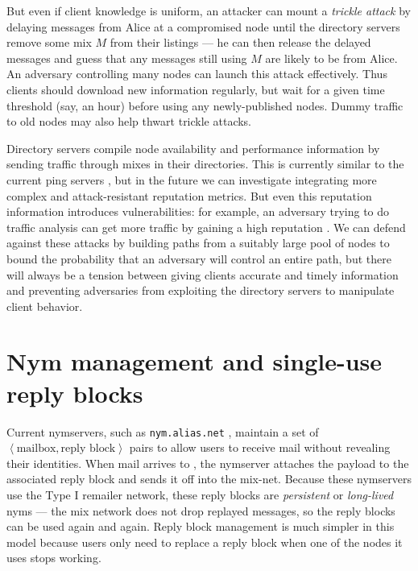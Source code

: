 \documentclass[11pt]{IEEEtran}
\newcommand\emailaddr{\begingroup \def\UrlLeft{<}\def\UrlRight{>}\urlstyle{tt}\Url}
\begin{document}
But even if client knowledge is uniform, an attacker can mount a
\emph{trickle attack} by delaying messages from Alice at a compromised
node until the directory servers remove some mix $M$ from their listings
--- he can then release the delayed messages and guess that any messages
still using $M$ are likely to be from Alice. An adversary controlling
many nodes can launch this attack effectively. Thus clients
should download new information regularly,
but wait for a given time threshold (say, an hour) before using any
newly-published nodes. Dummy traffic to old nodes may also 
help thwart trickle attacks.

Directory servers compile node availability and performance information by
sending traffic through mixes in their directories. This is currently
similar to the current ping servers \cite{levien}, but in the
future we can investigate integrating more complex and attack-resistant
reputation metrics.  But even this reputation information introduces
vulnerabilities: for example, an adversary 
trying to do traffic analysis
can get more traffic by gaining a high reputation \cite{mix-acc}. We can
defend against these attacks by building paths from a suitably large pool
of nodes \cite{casc-rep} to bound the probability that an adversary will
control an entire path, but there will always be a tension between giving
clients accurate and timely information and preventing adversaries from
exploiting the directory servers to manipulate client behavior.



\section{Nym management and single-use reply blocks}
\label{sec:nymservers}

Current nymservers, such as {\tt nym.alias.net} \cite{nym-alias-net},
maintain a set of $\left<\mbox{mailbox}, \mbox{reply block}\right>$ 
pairs to allow users to
receive mail without revealing their identities. When mail arrives to
\emailaddr{bob@nym.alias.net}, the nymserver attaches the payload to
the associated
reply block and sends it off into the mix-net. Because these nymservers
use the Type I remailer network, these reply blocks are \emph{persistent}
or \emph{long-lived} nyms --- the mix network does not drop replayed
messages, so the reply blocks can be used again and again. Reply block
management is much simpler in this model because users only need to
replace a reply block when one of the nodes it uses stops working.
\end{document}
